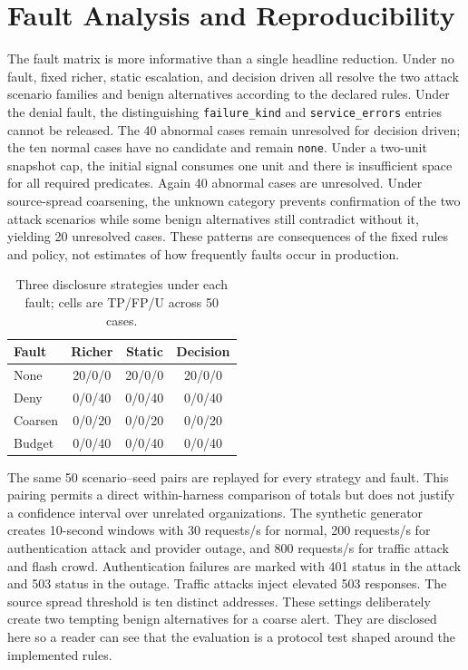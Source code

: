 \section{Fault Analysis and Reproducibility}
The fault matrix is more informative than a single headline reduction. Under no fault, fixed richer, static escalation, and decision driven all resolve the two attack scenario families and benign alternatives according to the declared rules. Under the denial fault, the distinguishing \texttt{failure\_kind} and \texttt{service\_errors} entries cannot be released. The 40 abnormal cases remain unresolved for decision driven; the ten normal cases have no candidate and remain \texttt{none}. Under a two-unit snapshot cap, the initial signal consumes one unit and there is insufficient space for all required predicates. Again 40 abnormal cases are unresolved. Under source-spread coarsening, the unknown category prevents confirmation of the two attack scenarios while some benign alternatives still contradict without it, yielding 20 unresolved cases. These patterns are consequences of the fixed rules and policy, not estimates of how frequently faults occur in production.

\begin{table}[t]
\centering\caption{Three disclosure strategies under each fault; cells are TP/FP/U across 50 cases.}
\label{tab:matrix}\scriptsize
\begin{tabular}{lccc}\hline
Fault & Richer & Static & Decision \\\hline
None &20/0/0&20/0/0&20/0/0\\
Deny &0/0/40&0/0/40&0/0/40\\
Coarsen &0/0/20&0/0/20&0/0/20\\
Budget &0/0/40&0/0/40&0/0/40\\\hline
\end{tabular}
\end{table}

The same 50 scenario--seed pairs are replayed for every strategy and fault. This pairing permits a direct within-harness comparison of totals but does not justify a confidence interval over unrelated organizations. The synthetic generator creates 10-second windows with 30 requests/s for normal, 200 requests/s for authentication attack and provider outage, and 800 requests/s for traffic attack and flash crowd. Authentication failures are marked with 401 status in the attack and 503 status in the outage. Traffic attacks inject elevated 503 responses. The source spread threshold is ten distinct addresses. These settings deliberately create two tempting benign alternatives for a coarse alert. They are disclosed here so a reader can see that the evaluation is a protocol test shaped around the implemented rules.

